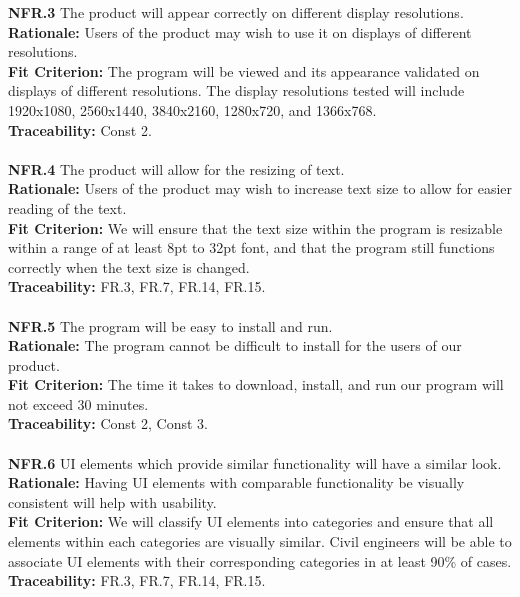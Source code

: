 \documentclass[12pt]{article}
\begin{document}
  \noindent\textbf{NFR.3} The product will appear correctly on different display resolutions.\\
  \textbf{Rationale:} Users of the product may wish to use it on displays of different resolutions.\\
  \textbf{Fit Criterion:} The program will be viewed and its appearance validated on displays of different resolutions. The display resolutions tested will include 1920x1080, 2560x1440, 3840x2160, 1280x720, and 1366x768.\\
  \textbf{Traceability:} Const 2.\\\\

  \noindent\textbf{NFR.4} The product will allow for the resizing of text.\\
  \textbf{Rationale:} Users of the product may wish to increase text size to allow for easier reading of the text.\\
  \textbf{Fit Criterion:} We will ensure that the text size within the program is resizable within a range of at least 8pt to 32pt font, and that the program still functions correctly when the text size is changed.\\
  \textbf{Traceability:} FR.3, FR.7, FR.14, FR.15.\\\\

  \noindent\textbf{NFR.5} The program will be easy to install and run.\\
  \textbf{Rationale:} The program cannot be difficult to install for the users of our product.\\
  \textbf{Fit Criterion:} The time it takes to download, install, and run our program will not exceed 30 minutes.\\
  \textbf{Traceability:} Const 2, Const 3.\\\\

  \noindent\textbf{NFR.6} UI elements which provide similar functionality will have a similar look.\\
  \textbf{Rationale:} Having UI elements with comparable functionality be visually consistent will help with usability.\\
  \textbf{Fit Criterion:} We will classify UI elements into categories and ensure that all elements within each categories are visually similar. Civil engineers will be able to associate UI elements with their corresponding categories in at least 90\% of cases.\\
  \textbf{Traceability:} FR.3, FR.7, FR.14, FR.15.\\\\
\end{document}
